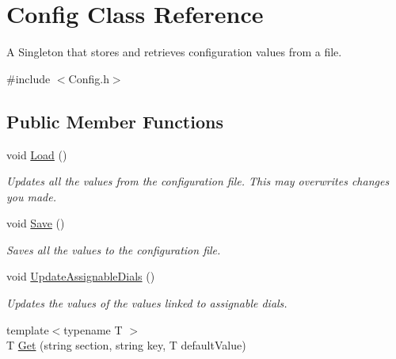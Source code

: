 \hypertarget{class_config}{
\section{\-Config \-Class \-Reference}
\label{class_config}
}


\-A \-Singleton that stores and retrieves configuration values from a file.  




{\ttfamily \#include $<$\-Config.\-h$>$}

\subsection*{\-Public \-Member \-Functions}
\begin{DoxyCompactItemize}
\item 
\hypertarget{class_config_a99b19da81af9603ca95103b375d5bd90}{
void \hyperlink{class_config_a99b19da81af9603ca95103b375d5bd90}{\-Load} ()}
\label{class_config_a99b19da81af9603ca95103b375d5bd90}

\begin{DoxyCompactList}\small\item\em \-Updates all the values from the configuration file. \-This may overwrites changes you made. \end{DoxyCompactList}\item 
\hypertarget{class_config_ab04c51d227c1457404ae9dadc1c576e1}{
void \hyperlink{class_config_ab04c51d227c1457404ae9dadc1c576e1}{\-Save} ()}
\label{class_config_ab04c51d227c1457404ae9dadc1c576e1}

\begin{DoxyCompactList}\small\item\em \-Saves all the values to the configuration file. \end{DoxyCompactList}\item 
\hypertarget{class_config_a2064e621e224d1f6053ef7fabe4d4045}{
void \hyperlink{class_config_a2064e621e224d1f6053ef7fabe4d4045}{\-Update\-Assignable\-Dials} ()}
\label{class_config_a2064e621e224d1f6053ef7fabe4d4045}

\begin{DoxyCompactList}\small\item\em \-Updates the values of the values linked to assignable dials. \end{DoxyCompactList}\item 
\hypertarget{class_config_ae2af4140fa3482e07978c8f8f023b42d}{
{\footnotesize template$<$typename T $>$ }\\\-T \hyperlink{class_config_ae2af4140fa3482e07978c8f8f023b42d}{\-Get} (string section, string key, \-T default\-Value)}
\label{class_config_ae2af4140fa3482e07978c8f8f023b42d}


\end{DoxyCompactItemize}

